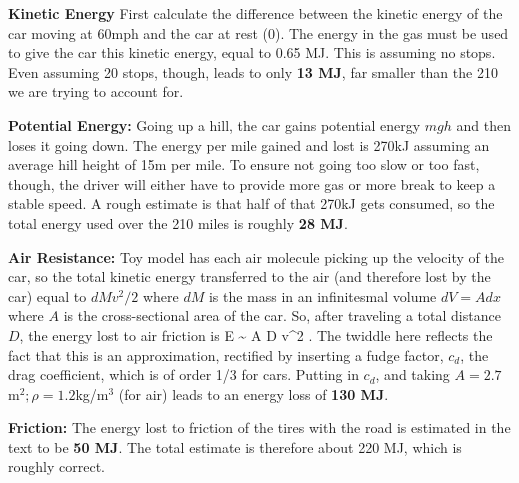 \documentclass[11pt]{book}
\begin{document}
\bei
\item {\bf Kinetic Energy} First calculate the difference between the kinetic energy of the car moving at 60mph and the car at rest (0). The energy in the gas must be used to give the car this kinetic energy, equal to 0.65 MJ. This is assuming no stops. Even assuming 20 stops, though, leads to only {\bf 13 MJ}, far smaller than the 210 we are trying to account for. 
\item {\bf Potential Energy:} Going up a hill, the car gains potential energy $mgh$ and then loses it going down. The energy per mile gained and lost is 270kJ assuming an average hill height of 15m per mile. To ensure not going too slow or too fast, though, the driver will either have to provide more gas or more break to keep a stable speed. A rough estimate is that half of that 270kJ gets consumed, so the total energy used over the 210 miles is roughly {\bf 28 MJ}.
\item {\bf Air Resistance:} Toy model has each air molecule picking up the velocity of the car, so the total kinetic energy transferred to the air (and therefore lost by the car) equal to $dMv^2/2$ where $dM$ is the mass in an infinitesmal volume $dV = Adx$ where $A$ is the cross-sectional area of the car. So, after traveling a total distance $D$, the energy lost to air friction is
\be
\Delta E \sim {} \rho A D v^2
.\ee 
The twiddle here reflects the fact that this is an approximation, rectified by inserting a fudge factor, $c_d$, the drag coefficient, which is of order 1/3 for cars. Putting in $c_d$, and taking $A=2.7$m$^2; \rho=1.2$kg/m$^3$ (for air) leads to an energy loss of {\bf 130 MJ}.
\item {\bf Friction:} The energy lost to friction of the tires with the road is estimated in the text to be {\bf 50 MJ}.
\eei
The total estimate is therefore about 220 MJ, which is roughly correct.

\end{document}
